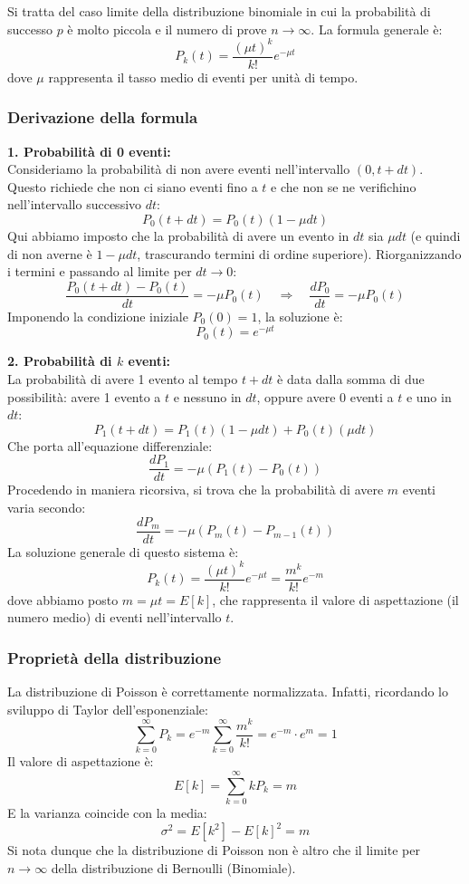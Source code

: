\documentclass{article}
\theoremstyle{remark}
\begin{document}
Si tratta del caso limite della distribuzione binomiale in cui la probabilità di successo $p$ è molto piccola e il numero di prove $n \rightarrow \infty$. La formula generale è:
\[
    P_k(t)=\frac{(\mu t)^k}{k!}e^{-\mu t}
\]
dove $\mu$ rappresenta il tasso medio di eventi per unità di tempo.

\subsubsection*{Derivazione della formula}

\textbf{1. Probabilità di 0 eventi:} \\
Consideriamo la probabilità di non avere eventi nell'intervallo $(0, t+dt)$. Questo richiede che non ci siano eventi fino a $t$ e che non se ne verifichino nell'intervallo successivo $dt$:
\[
P_0(t+dt)=P_0(t)(1-\mu dt)
\]
Qui abbiamo imposto che la probabilità di avere un evento in $dt$ sia $\mu dt$ (e quindi di non averne è $1-\mu dt$, trascurando termini di ordine superiore). Riorganizzando i termini e passando al limite per $dt \to 0$:
\[
\frac{P_0(t+dt) - P_0(t)}{dt} = -\mu P_0(t) \quad \Rightarrow \quad \frac{dP_0}{dt} = -\mu P_0(t)
\]
Imponendo la condizione iniziale $P_0(0)=1$, la soluzione è:
\[
P_0(t)=e^{-\mu t}
\]

\textbf{2. Probabilità di $k$ eventi:} \\
La probabilità di avere 1 evento al tempo $t+dt$ è data dalla somma di due possibilità: avere 1 evento a $t$ e nessuno in $dt$, oppure avere 0 eventi a $t$ e uno in $dt$:
\[
P_1(t+dt)=P_1(t)(1-\mu dt) + P_0(t)(\mu dt)
\]
Che porta all'equazione differenziale:
\[
\frac{dP_1}{dt}=- \mu (P_1(t)-P_0(t))
\]
Procedendo in maniera ricorsiva, si trova che la probabilità di avere $m$ eventi varia secondo:
\[
\frac{dP_m}{dt}=- \mu (P_m(t)-P_{m-1}(t))
\]
La soluzione generale di questo sistema è:
\[
P_k(t)=\frac{(\mu t)^k}{k!}e^{-\mu t}=\frac{m^k}{k!}e^{-m}
\]
dove abbiamo posto $m=\mu t=E[k]$, che rappresenta il valore di aspettazione (il numero medio) di eventi nell'intervallo $t$.

\subsubsection*{Proprietà della distribuzione}
La distribuzione di Poisson è correttamente normalizzata. Infatti, ricordando lo sviluppo di Taylor dell'esponenziale:
\[
\sum_{k=0}^{\infty}P_k = e^{-m} \sum_{k=0}^{\infty}\frac{m^k}{k!} = e^{-m} \cdot e^m = 1
\]
Il valore di aspettazione è:
\[
E[k]=\sum_{k=0}^{\infty}k P_k = m 
\]
E la varianza coincide con la media:
\[
{\sigma^2}=E[k^2]-{E[k]}^2=m
\]
Si nota dunque che la distribuzione di Poisson non è altro che il limite per $n \rightarrow \infty$ della distribuzione di Bernoulli (Binomiale).
\end{document}
